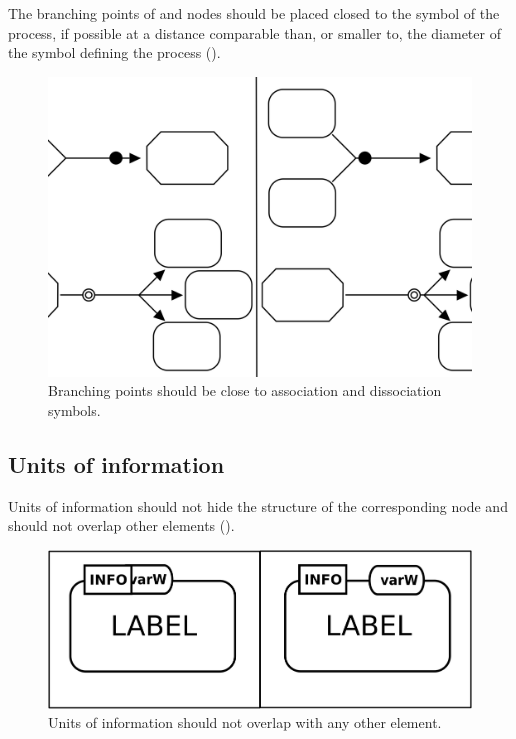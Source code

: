 The branching points of  and  nodes should be placed closed to the symbol of the process, if possible at a distance comparable than, or smaller to, the diameter of the symbol defining the process ().

\begin{figure}[htb]
  \centering
  \includegraphics[scale=0.3]{images/layout-branching}
  \caption{Branching points should be close to association and dissociation symbols.}\label{fig:branching}
\end{figure}

\subsection{Units of information}

Units of information should not hide the structure of the
corresponding node and should not overlap other
elements ().

\begin{figure}[htb]
  \centering
  \includegraphics[scale=0.5]{images/layout-unit-information}
  \caption{Units of information should not overlap with any
  other element.}\label{fig:layout7}
\end{figure}


